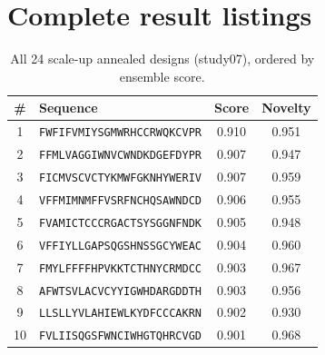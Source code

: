 \section{Complete result listings}\label{app:listings}
\begin{table}[h]\centering\caption{All 24 scale-up annealed designs (study07), ordered by ensemble score.}\label{tab:alldesigns}
\small\begin{tabular}{clcc}\hline \# & Sequence & Score & Novelty \\ \hline
1 & \texttt{FWFIFVMIYSGMWRHCCRWQKCVPR} & 0.910 & 0.951 \\
2 & \texttt{FFMLVAGGIWNVCWNDKDGEFDYPR} & 0.907 & 0.947 \\
3 & \texttt{FICMVSCVCTYKMWFGKNHYWERIV} & 0.907 & 0.959 \\
4 & \texttt{VFFMIMNMFFVSRFNCHQSAWNDCD} & 0.906 & 0.955 \\
5 & \texttt{FVAMICTCCCRGACTSYSGGNFNDK} & 0.905 & 0.948 \\
6 & \texttt{VFFIYLLGAPSQGSHNSSGCYWEAC} & 0.904 & 0.960 \\
7 & \texttt{FMYLFFFFHPVKKTCTHNYCRMDCC} & 0.903 & 0.967 \\
8 & \texttt{AFWTSVLACVCYYIGWHDARGDDTH} & 0.903 & 0.956 \\
9 & \texttt{LLSLLYVLAHIEWLKYDFCCCAKRN} & 0.902 & 0.930 \\
10 & \texttt{FVLIISQGSFWNCIWHGTQHRCVGD} & 0.901 & 0.968 \\
\hline\end{tabular}\end{table}
